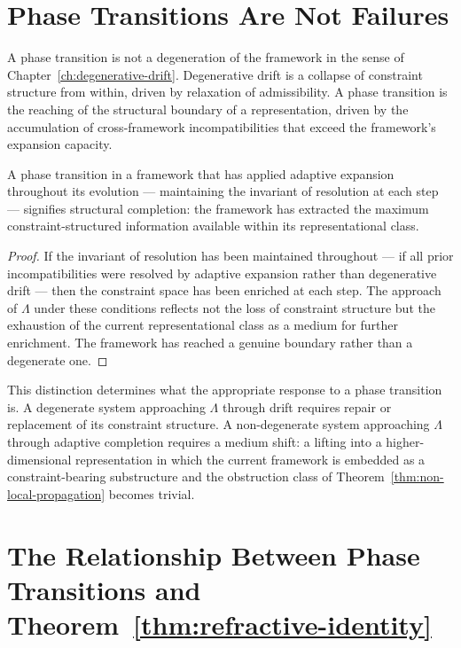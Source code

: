 \documentclass[11pt,openany]{book}
\begin{document}
\section{Phase Transitions Are Not Failures}
\label{sec:not-failures}

A phase transition is not a degeneration of the framework
in the sense of Chapter~\ref{ch:degenerative-drift}.
Degenerative drift is a collapse of constraint structure
from within, driven by relaxation of admissibility.  A
phase transition is the reaching of the structural boundary
of a representation, driven by the accumulation of
cross-framework incompatibilities that exceed the
framework's expansion capacity.

\begin{proposition}
\label{prop:structural-completion}
A phase transition in a framework that has applied adaptive
expansion throughout its evolution --- maintaining the
invariant of resolution at each step --- signifies
structural completion: the framework has extracted the
maximum constraint-structured information available within
its representational class.
\end{proposition}

\begin{proof}
If the invariant of resolution has been maintained
throughout --- if all prior incompatibilities were resolved
by adaptive expansion rather than degenerative drift ---
then the constraint space has been enriched at each step.
The approach of $\Lambda$ under these conditions reflects
not the loss of constraint structure but the exhaustion of
the current representational class as a medium for further
enrichment.  The framework has reached a genuine boundary
rather than a degenerate one.
\end{proof}

This distinction determines what the appropriate response
to a phase transition is.  A degenerate system approaching
$\Lambda$ through drift requires repair or replacement of
its constraint structure.  A non-degenerate system
approaching $\Lambda$ through adaptive completion requires
a medium shift: a lifting into a higher-dimensional
representation in which the current framework is embedded
as a constraint-bearing substructure and the obstruction
class of Theorem~\ref{thm:non-local-propagation} becomes
trivial.

\section[Phase Transitions and Theorem~\protect\ref{thm:refractive-identity}]{The Relationship Between Phase Transitions and Theorem~\ref{thm:refractive-identity}}
\label{sec:relation-theorem_b}
\end{document}
